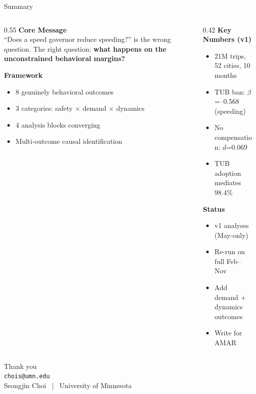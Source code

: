 \documentclass[aspectratio=169, 11pt]{beamer}
\begin{document}
\begin{frame}{Summary}
\begin{columns}[T]
\begin{column}{0.55\textwidth}
\textbf{\color{UMNMaroon}Core Message}\\
``Does a speed governor reduce speeding?'' is the wrong question. The right question: \textbf{what happens on the unconstrained behavioral margins?}

\vspace{0.3cm}
\textbf{Framework}
\begin{itemize}
\item 8 genuinely behavioral outcomes
\item 3 categories: safety $\times$ demand $\times$ dynamics
\item 4 analysis blocks converging
\item Multi-outcome causal identification
\end{itemize}
\end{column}
\begin{column}{0.42\textwidth}
\textbf{Key Numbers (v1)}
\begin{itemize}
\item 21M trips, 52 cities, 10 months
\item TUB ban: $\beta$=--0.568 (speeding)
\item No compensation: $d$=0.069
\item TUB adoption mediates 98.4\%
\end{itemize}

\vspace{0.2cm}
\textbf{Status}
\begin{itemize}
\item[\color{AccentGreen}\faCheckCircle] v1 analyses (May-only)
\item[\color{PhaseOrange}\faCircle] Re-run on full Feb--Nov
\item[\color{PhaseOrange}\faCircle] Add demand + dynamics outcomes
\item[\color{gray}\faCircle] Write for AMAR
\end{itemize}
\end{column}
\end{columns}
\end{frame}

\begin{frame}[standout]
\Large Thank you\\[10pt]
\normalsize
\texttt{chois@umn.edu}\\[5pt]
\footnotesize
Seongjin Choi ~|~ University of Minnesota
\end{frame}
\end{document}
